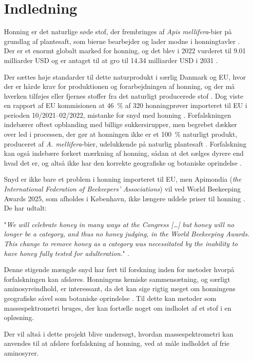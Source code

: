 \chapter*{\hypertarget{chap:indledning}{Indledning}}

Honning er det naturlige søde stof, der frembringes af \textit{Apis mellifera}-bier på grundlag af plantesaft, som bierne bearbejder og lader modne i honningtavler \parencite{honningbekDA}.
Der er et enormt globalt marked for honning, og det blev i 2022 vurderet til \num{9.01} milliarder USD og er antaget til at gro til \num{14.34} milliarder USD i 2031 \parencite{honeyMarket}.
\par Der sættes høje standarder til dette naturprodukt i særlig Danmark og EU, hvor der er hårde krav for produktionen og forarbejdningen af honning, og der må hverken tilføjes eller fjernes stoffer fra det naturligt producerede stof \parencite{honningbekDA,honningbekEU}.
Dog viste en rapport af EU kommisionen at \qty{46}{\percent} af \num{320} honningprøver importeret til EU i perioden 10/2021--02/2022, mistanke for snyd med honning \parencite{EUhoney}.
Forfalskningen indebærer oftest opblanding med billige sukkersirupper, men begrebet dækker over led i processen, der gør at honningen ikke er et \qty{100}{\percent} naturligt produkt, produceret af \textit{A. mellifera}-bier, udelukkende på naturlig plantesaft \parencite{adulterationhoney}.
Forfalskning kan også indebære forkert mærkning af honning, sådan at det sælges dyrere end hvad det er, og altså ikke har den korrekte geografiske og botaniske oprindelse \parencite{geohoney}.
\par Snyd er ikke bare et problem i honning importeret til EU, men Apimondia (\textit{the International Federation of Beekeepers’ Associations}) vil ved World Beekeeping Awards 2025, som afholdes i København, ikke længere uddele priser til honning \parencite{awardFraud}.
De har udtalt:
\par "\textit{We will celebrate honey in many ways at the Congress [\dots] but honey will no longer be a category, and thus no honey judging, in the World Beekeeping Awards. This change to remove honey as a category was necessitated by the inability to have honey fully tested for adulteration.}" \parencite{apimondia}.
\par Denne stigende mængde snyd har ført til forskning inden for metoder hvorpå forfalskningen kan afsløres.
Honningens kemiske sammensætning, og særligt aminosyreindhold, er interessant, da det kan sige rigtig meget om honningens geografiske såvel som botaniske oprindelse \parencite{geohoney}.
Til dette kan metoder som massespektrometri bruges, der kan fortælle noget om indholet af et stof i en opløsning.
\par Der vil altså i dette projekt blive undersøgt, hvordan massespektrometri kan anvendes til at afsløre forfalskning af honning, ved at måle indholdet af frie aminosyrer.
